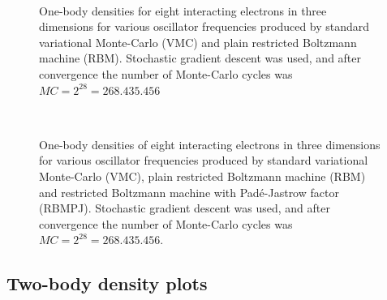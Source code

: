 \begin{figure} [H]%
	\centering
	\\
	
	\caption{One-body densities for eight interacting electrons in three dimensions for various oscillator frequencies produced by standard variational Monte-Carlo (VMC) and plain restricted Boltzmann machine (RBM). Stochastic gradient descent was used, and after convergence the number of Monte-Carlo cycles was $MC=2^{28}=268.435.456$}%
	\label{fig:OB_interaction_8P_3D}
\end{figure}

\begin{figure} [H]%
	\centering
	\\
	
	\caption{One-body densities of eight interacting electrons in three dimensions for various oscillator frequencies produced by standard variational Monte-Carlo (VMC), plain restricted Boltzmann machine (RBM) and restricted Boltzmann machine with Padé-Jastrow factor (RBMPJ). Stochastic gradient descent was used, and after convergence the number of Monte-Carlo cycles was $MC=2^{28}=268.435.456$.}%
	\label{fig:OB_interaction_12P_3D}
\end{figure}

\subsection{Two-body density plots}
